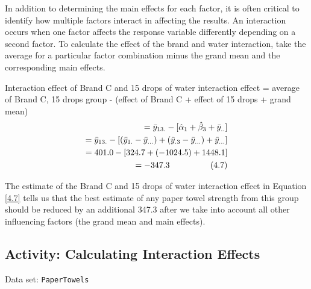 \documentclass[
]{book}
\begin{document}
In addition to determining the main effects for each factor, it is often critical to identify how multiple factors interact in affecting the results. An interaction occurs when one factor affects the response variable differently depending on a second factor. To calculate the effect of the brand and water interaction, take the average for a particular factor combination minus the grand mean and the corresponding main effects.

Interaction effect of Brand C and 15 drops of water interaction effect
= average of Brand C, 15 drops group
- (effect of Brand C + effect of 15 drops + grand mean)
\begin{align}
= \bar{y}_{13.} - [\hat{\alpha}_1 + \hat{\beta}_3 + \bar{y}_{..}] \notag \\
= \bar{y}_{13.} - [(\bar{y}_{1.} - \bar{y}_{...}) + (\bar{y}_{.3} - \bar{y}_{...}) + \bar{y}_{...}] \notag \\
= 401.0 - [324.7 + (-1024.5) + 1448.1] \notag \\
= -347.3 \hspace{1cm} \tag{4.7}
\end{align}

The estimate of the Brand C and 15 drops of water interaction effect in Equation \ref{4.7} tells us that the best estimate of any paper towel strength from this group should be reduced by an additional 347.3 after we take into account all other influencing factors (the grand mean and main effects).

\hypertarget{activity-calculating-interaction-effects}{%
\subsection*{Activity: Calculating Interaction Effects}\label{activity-calculating-interaction-effects}}

Data set: \texttt{PaperTowels}
\end{document}
